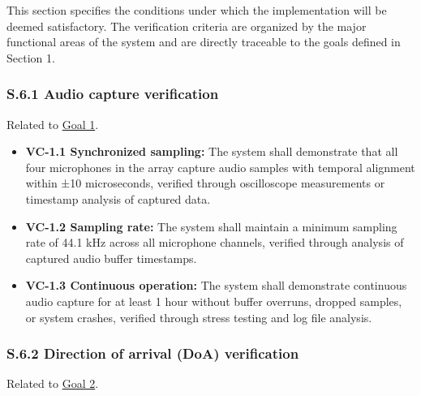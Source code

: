 \documentclass[12pt]{article}
\theoremstyle{definition}
\begin{document}
This section specifies the conditions under which the implementation will be 
deemed satisfactory. The verification criteria are organized by the major 
functional areas of the system and are directly traceable to the goals 
defined in Section 1.

\subsubsection{S.6.1 Audio capture verification}

Related to \hyperref[goal:audio_capture]{Goal 1}.

\begin{itemize}
\item \textbf{VC-1.1 Synchronized sampling:} The system shall demonstrate that 
all four microphones in the array capture audio samples with temporal alignment 
within ±10 microseconds, verified through oscilloscope measurements or 
timestamp analysis of captured data.

\item \textbf{VC-1.2 Sampling rate:} The system shall maintain a minimum 
sampling rate of 44.1 kHz across all microphone channels, verified through 
analysis of captured audio buffer timestamps.

\item \textbf{VC-1.3 Continuous operation:} The system shall demonstrate 
continuous audio capture for at least 1 hour without buffer overruns, 
dropped samples, or system crashes, verified through stress testing and 
log file analysis.
\end{itemize}

\subsubsection{S.6.2 Direction of arrival (DoA) verification}

Related to \hyperref[goal:audio_direction_analysis]{Goal 2}.
\end{document}
